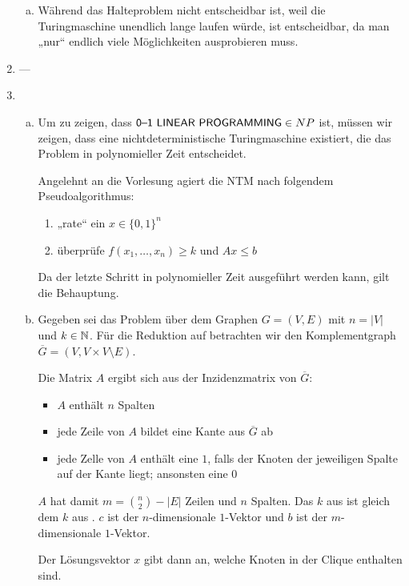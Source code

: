 \begin{enumerate}
\begin{enumerate}[(a)]
      \item Während das Halteproblem nicht entscheidbar ist, weil die
        Turingmaschine unendlich lange laufen würde, ist \COLORDrei{}
        entscheidbar, da man „nur“ endlich viele Möglichkeiten ausprobieren
        muss.
    \end{enumerate}

  \item ---

  \item
    \begin{enumerate}[(a)]
      \item Um zu zeigen, dass $\textsf{0--1 LINEAR PROGRAMMING}{} \in NP$ ist, müssen wir zeigen, dass
        eine nichtdeterministische Turingmaschine existiert, die das Problem in
        polynomieller Zeit entscheidet.

        Angelehnt an die Vorlesung agiert die NTM nach folgendem
        Pseudoalgorithmus:
        \begin{enumerate}
          \item „rate“ ein $x \in {\{0, 1\}}^n$
          \item überprüfe $f(x_1, \ldots, x_n) \geq k$ und $Ax \leq b$
        \end{enumerate}
        Da der letzte Schritt in polynomieller Zeit ausgeführt werden kann, gilt
        die Behauptung.

      \item Gegeben sei das Problem \CLIQUE{} über dem Graphen $G = (V, E)$ mit
        $n = |V|$ und $k \in \mathbb{N}$. Für die Reduktion auf \NELP{} betrachten wir
        den Komplementgraph $\overline{G} = (V, V \times V \setminus E)$.

        Die Matrix $A$ ergibt sich aus der Inzidenzmatrix von $\overline{G}$:
        \begin{itemize}
          \item $A$ enthält $n$ Spalten
          \item jede Zeile von $A$ bildet eine Kante aus $\overline{G}$ ab
          \item jede Zelle von $A$ enthält eine $1$, falls der Knoten der
            jeweiligen Spalte auf der Kante liegt; ansonsten eine $0$
        \end{itemize}
        $A$ hat damit $m = \binom{n}{2} - |E|$ Zeilen und $n$ Spalten. Das $k$
        aus \CLIQUE{} ist gleich dem $k$ aus \NELP{}. $c$ ist der
        $n$-dimensionale $1$-Vektor und $b$ ist der $m$-dimensionale $1$-Vektor.

        Der Lösungsvektor $x$ gibt dann an, welche Knoten in der Clique
        enthalten sind.


\end{enumerate}
\end{enumerate}
